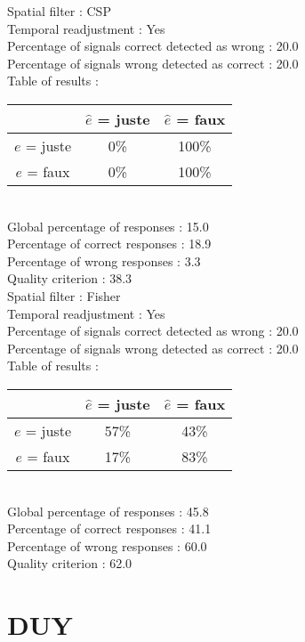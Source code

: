 Spatial filter : CSP \\
Temporal readjustment : Yes \\
Percentage of signals correct detected as wrong :   20.0 \\
Percentage of signals wrong detected as correct :   20.0 \\
Table of results : \\
\begin{tabular}{|c|c|c|}
\hline				& $\hat{e}$ = juste & $\hat{e}$ = faux \\
\hline  $e$ = juste	&      0\%			&    100\%		\\
\hline  $e$ = faux	&      0\%			&    100\%		\\
\hline
\end{tabular}\\
Global percentage of responses :   15.0 \\
Percentage of correct responses :   18.9 \\
Percentage of wrong responses :    3.3 \\
Quality criterion :   38.3 \\

Spatial filter : Fisher \\
Temporal readjustment : Yes \\
Percentage of signals correct detected as wrong :   20.0 \\
Percentage of signals wrong detected as correct :   20.0 \\
Table of results : \\
\begin{tabular}{|c|c|c|}
\hline				& $\hat{e}$ = juste & $\hat{e}$ = faux \\
\hline  $e$ = juste	&     57\%			&     43\%		\\
\hline  $e$ = faux	&     17\%			&     83\%		\\
\hline
\end{tabular}\\
Global percentage of responses :   45.8 \\
Percentage of correct responses :   41.1 \\
Percentage of wrong responses :   60.0 \\
Quality criterion :   62.0 \\

\section*{DUY}
